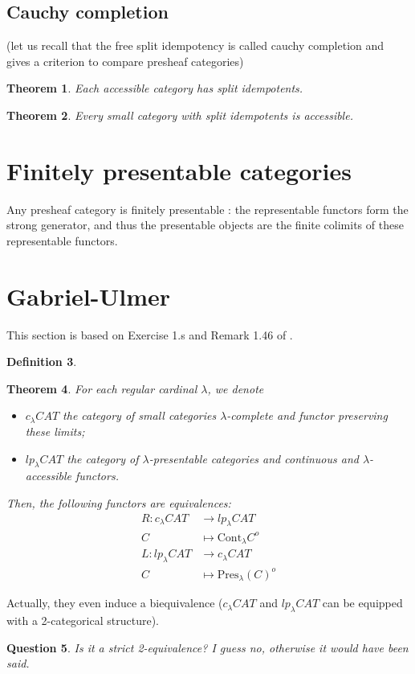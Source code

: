 \documentclass{article}
\newcommand{\Cont}[1]{\text{Cont}_{#1}}
\newcommand{\Pres}[1]{\text{Pres}_{#1}}
\newtheorem{theorem}{Theorem}[section]
\newtheorem{definition}[theorem]{Definition}
\newtheorem{question}[theorem]{Question}
\begin{document}
\subsection{Cauchy completion}
(let us recall that the free split idempotency is called cauchy completion and
gives a criterion to compare presheaf categories)
\begin{theorem}
  \cite[2.4]{adamek_rosicky}
 Each accessible category has split idempotents. 
\end{theorem}
\begin{theorem}
 Every small category with split idempotents is accessible. 
\end{theorem}
\section{Finitely presentable categories}
Any presheaf category is finitely presentable \cite{adamek_rosicky}: the
representable functors form the strong generator, and thus the presentable
objects are the finite colimits of these representable functors.

\section{Gabriel-Ulmer}
This section is based on Exercise 1.s and Remark 1.46 of \cite{adamek_rosicky}.
\begin{definition}
  
\end{definition}

\begin{theorem}
  For each regular cardinal $\lambda$, we denote
  \begin{itemize}
  \item 
  $c_{\lambda}CAT$ the category of
small categories $\lambda$-complete and functor preserving these limits;
\item $lp_{\lambda}CAT$ the category of $\lambda$-presentable categories and
  continuous and $\lambda$-accessible functors.
  \end{itemize}
Then, the following functors are equivalences:
\begin{align*}
 R : c_{\lambda}CAT & \rightarrow lp_{\lambda}CAT
  \\
  C & \mapsto \Cont\lambda C^o
      \\
 L : lp_{\lambda}CAT& \rightarrow c_{\lambda}CAT 
  \\
  C & \mapsto \Pres\lambda(C)^o
\end{align*}
\end{theorem}
Actually, they even induce a biequivalence ($c_{\lambda}CAT$ and
$lp_{\lambda}CAT$ can be equipped with a 2-categorical structure).
\begin{question}
 Is it a strict 2-equivalence? I guess no, otherwise it would have been said. 
\end{question}
\end{document}

